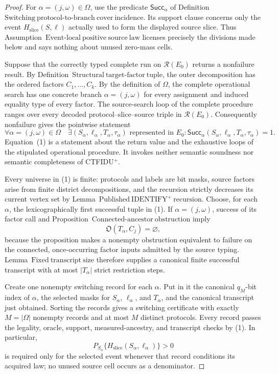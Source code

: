 \documentclass{article}
\begin{document}
\begin{proof}
For \(\alpha=(j,\omega)\in\Omega\), use the predicate
\(\mathsf{Succ}_{\alpha}\) of Definition~\(\mathrm{Switching\ protocol\mbox{-}to\mbox{-}branch\ cover\ incidence}\).
Its support clause concerns only the event \(H_{\mathrm{slice}}(S,\ell)\) actually used to form the displayed source slice.  Thus Assumption~\(\mathrm{Event\mbox{-}local\ positive\ source\ law}\) licenses precisely the divisions made below and says nothing about unused zero-mass cells.

Suppose that the correctly typed complete run on \(\mathcal R(E_0)\) returns a nonfailure result.  By Definition~\(\mathrm{Structural\ target\mbox{-}factor\ tuple}\), the outer decomposition has the ordered factors \(C_1,\ldots,C_k\).  By the definition of \(\Omega\), the complete operational search has one concrete branch \(\alpha=(j,\omega)\) for every assignment and induced equality type of every factor.  The source-search loop of the complete procedure ranges over every decoded protocol--slice--source triple in \(\mathcal R(E_0)\).  Consequently nonfailure gives the pointwise statement
\[
 \forall\alpha=(j,\omega)\in\Omega\quad
 \exists(S_{\alpha},\ell_{\alpha},T_{\alpha},\tau_{\alpha})
 \text{ represented in }E_0:
 \mathsf{Succ}_{\alpha}(S_{\alpha},\ell_{\alpha},T_{\alpha},\tau_{\alpha})=1.
 \tag{1}
\]
Equation~(1) is a statement about the return value and the exhaustive loops of the stipulated operational procedure.  It invokes neither semantic soundness nor semantic completeness of CTFIDU\({}^{+}\).

Every universe in (1) is finite: protocols and labels are bit masks, source factors arise from finite district decompositions, and the recursion strictly decreases its current vertex set by Lemma~\(\mathrm{Published\ IDENTIFY}^{+}\mathrm{\ recursion}\).  Choose, for each \(\alpha\), the lexicographically first successful tuple in (1).  If \(\alpha=(j,\omega)\), success of its factor call and Proposition~\(\mathrm{Connected\mbox{-}ancestor\ obstruction}\) imply
\[
 \mathfrak O(T_{\alpha},C_j)=\varnothing,
 \tag{2}
\]
because the proposition makes a nonempty obstruction equivalent to failure on the connected, once-occurring factor inputs admitted by the source typing.  Lemma~\(\mathrm{Fixed\ transcript\ size}\) therefore supplies a canonical finite successful transcript with at most \(|T_{\alpha}|\) strict restriction steps.

Create one nonempty switching record for each \(\alpha\).  Put in it the canonical \(q_M\)-bit index of \(\alpha\), the selected masks for \(S_{\alpha}\), \(\ell_{\alpha}\), and \(T_{\alpha}\), and the canonical transcript just obtained.  Sorting the records gives a switching certificate with exactly \(M=|\Omega|\) nonempty records and at most \(M\) distinct protocols.  Every record passes the legality, oracle, support, measured-ancestry, and transcript checks by (1).  In particular,
\[
 P_{S_{\alpha}}\{H_{\mathrm{slice}}(S_{\alpha},\ell_{\alpha})\}>0
 \tag{3}
\]
is required only for the selected event whenever that record conditions its acquired law; no unused source cell occurs as a denominator.


\end{proof}
\end{document}
